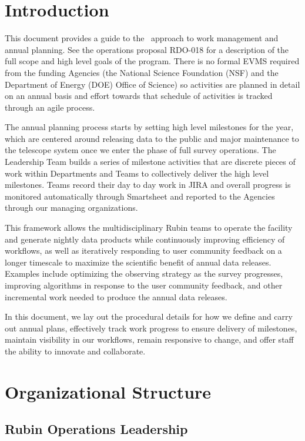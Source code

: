 \section{Introduction}

This document provides a guide to the \VRO\ approach to work management and annual planning.
See the operations proposal RDO-018 for a description of the full scope and high level goals of the program.
There is no formal \gls{EVMS} required from the funding Agencies (the National Science Foundation (NSF) and the Department of Energy (DOE) Office of Science) so activities are planned in detail on an annual basis and effort towards that schedule of activities is tracked through an agile process.

The annual planning process starts by setting high level milestones for the year, which are centered around releasing data to the public and major maintenance to the telescope system once we enter the phase of full survey operations.   
The Leadership Team builds a series of milestone activities that are discrete pieces of work within Departments and Teams to collectively deliver the high level milestones.  
Teams record their day to day work in \gls{JIRA} and overall progress is monitored automatically through Smartsheet and reported to the Agencies through our managing organizations.

This framework allows the multidisciplinary Rubin teams to operate the facility and generate nightly data products while continuously improving efficiency of workflows,
as well as iteratively responding to user community feedback on a longer timescale to maximize the scientific benefit of annual data releases.
Examples include optimizing the observing strategy as the survey progresses, improving algorithms in response to the user community feedback, 
and other incremental work needed to produce the annual data releases.

In this document, we lay out the procedural details for how we define and carry out annual plans, effectively track work progress to ensure delivery of milestones, maintain visibility in our workflows, remain responsive to change, and offer staff the ability to innovate and collaborate.


\section{Organizational Structure}
\label{sec:structure}


\subsection{Rubin Operations Leadership}
\label{sec:contacts}

